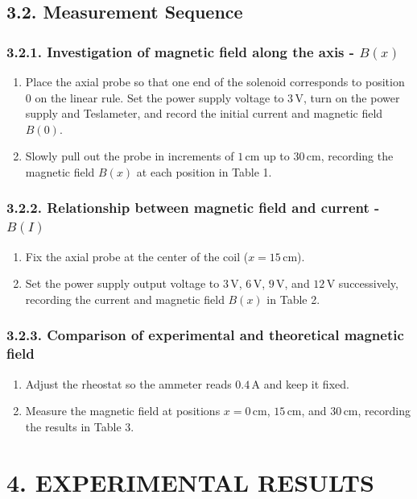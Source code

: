 \documentclass[12pt,oneside,a4paper]{article}
\theoremstyle{definition}
\begin{document}
	
	\subsection*{3.2. Measurement Sequence}
	\subsubsection*{3.2.1. Investigation of magnetic field along the axis - $B(x)$}
	\begin{enumerate}[leftmargin=1.5em]
		\item Place the axial probe so that one end of the solenoid corresponds to position $0$ on the linear rule. Set the power supply voltage to $3\,\text{V}$, turn on the power supply and Teslameter, and record the initial current and magnetic field $B(0)$.
		\item Slowly pull out the probe in increments of $1\,\text{cm}$ up to $30\,\text{cm}$, recording the magnetic field $B(x)$ at each position in Table 1.
	\end{enumerate}
	
	\subsubsection*{3.2.2. Relationship between magnetic field and current - $B(I)$}
	\begin{enumerate}[leftmargin=1.5em]
		\item Fix the axial probe at the center of the coil ($x = 15\,\text{cm}$).
		\item Set the power supply output voltage to $3\,\text{V}$, $6\,\text{V}$, $9\,\text{V}$, and $12\,\text{V}$ successively, recording the current and magnetic field $B(x)$ in Table 2.
	\end{enumerate}
	
	\subsubsection*{3.2.3. Comparison of experimental and theoretical magnetic field}
	\begin{enumerate}[leftmargin=1.5em]
		\item Adjust the rheostat so the ammeter reads $0.4\,\text{A}$ and keep it fixed.
		\item Measure the magnetic field at positions $x = 0\,\text{cm}$, $15\,\text{cm}$, and $30\,\text{cm}$, recording the results in Table 3.
	\end{enumerate}
	
	\section*{4. EXPERIMENTAL RESULTS}
	
\end{document}
